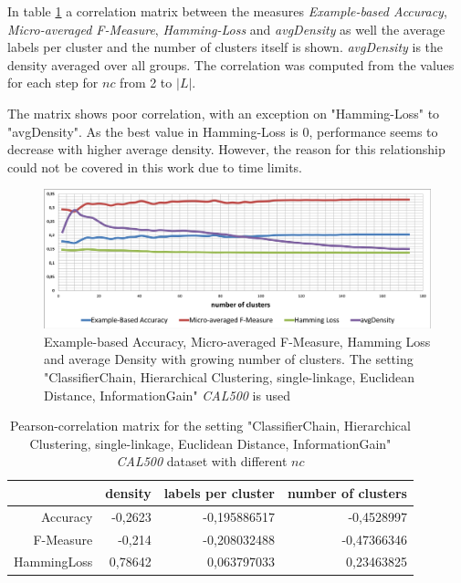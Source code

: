 				In table \ref{tab:cor} a correlation matrix between the measures \textit{Example-based Accuracy}, \textit{Micro-averaged F-Measure}, \textit{Hamming-Loss} and \textit{avgDensity} as well the average labels per cluster and the number of clusters itself is shown. \textit{avgDensity} is the density averaged over all groups. The correlation was computed from the values for each step for $nc$ from 2 to $|L|$.
					
				The matrix shows poor correlation, with an exception on "Hamming-Loss" to "avgDensity". As the best value in Hamming-Loss is 0, performance seems to decrease with higher average density. However, the reason for this relationship could not be covered in this work due to time limits.
 
				\begin{figure}
					\centering
					\includegraphics[width=.9\textwidth]{figures/cluster_corl.pdf}
					\caption{Example-based Accuracy, Micro-averaged F-Measure, Hamming Loss and average Density with growing number of clusters. The setting "ClassifierChain, Hierarchical Clustering, single-linkage, Euclidean Distance, InformationGain" \textit{CAL500} is used}
					\label{fig:clu_cor}
				\end{figure}

				\begin{table}\scriptsize
					\centering
					\begin{tabular}{r||r|r|r}
						& density & labels per cluster & number of clusters \\\hline\hline
						Accuracy & -0,2623 & -0,195886517 & -0,4528997 \\\hline
						F-Measure & -0,214 & -0,208032488 & -0,47366346 \\\hline
						HammingLoss & 0,78642 & 0,063797033 & 0,23463825 \\
					\end{tabular}
					\caption{Pearson-correlation matrix for the setting "ClassifierChain, Hierarchical Clustering, single-linkage, Euclidean Distance, InformationGain" \textit{CAL500} dataset with different $nc$}
					\label{tab:cor}
				\end{table}

